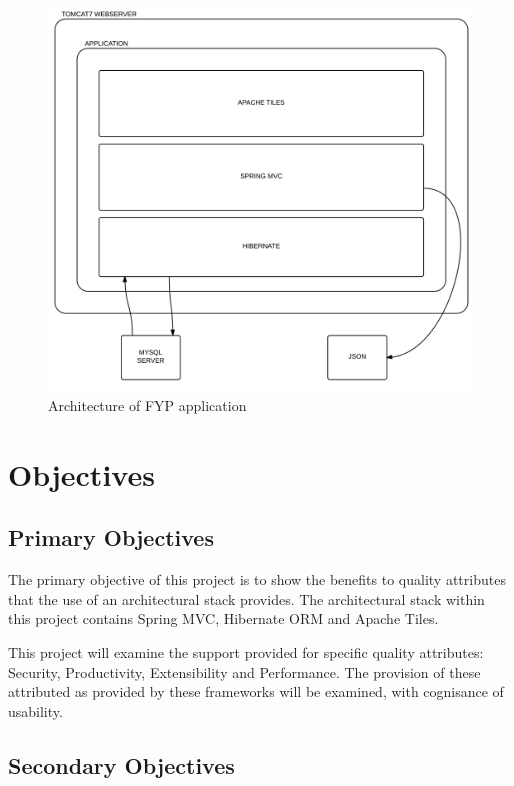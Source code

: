 \begin{figure}[H]
\begin{center}
\includegraphics[scale=0.24]{projarch.PNG}
\end{center}
\caption{Architecture of FYP application}
\label{fig:projstack}
\end{figure}

\section{Objectives}

\subsection{Primary Objectives}

The primary objective of this project is to show the benefits to quality attributes that the use of an architectural stack provides. The architectural stack within this project contains Spring MVC, Hibernate ORM and Apache Tiles. 

This project will examine the support provided for specific quality attributes: Security, Productivity, Extensibility and Performance. The provision of these attributed as provided by these frameworks will be examined, with cognisance of usability. 

\subsection{Secondary Objectives}


